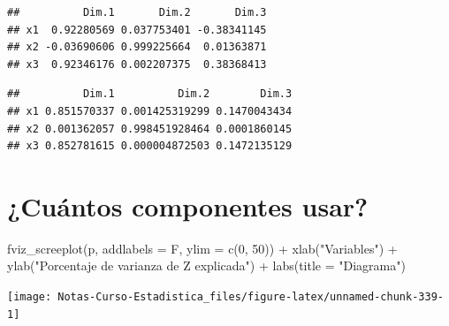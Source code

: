 \documentclass[
  12pt,
]{book}
\newenvironment{Shaded}{\begin{snugshade}}{\end{snugshade}}
\newcommand{\AttributeTok}[1]{\textcolor[rgb]{0.77,0.63,0.00}{#1}}
\newcommand{\DecValTok}[1]{\textcolor[rgb]{0.00,0.00,0.81}{#1}}
\newcommand{\FunctionTok}[1]{\textcolor[rgb]{0.00,0.00,0.00}{#1}}
\newcommand{\NormalTok}[1]{#1}
\newcommand{\SpecialCharTok}[1]{\textcolor[rgb]{0.00,0.00,0.00}{#1}}
\newcommand{\StringTok}[1]{\textcolor[rgb]{0.31,0.60,0.02}{#1}}
\begin{document}
\begin{verbatim}
##          Dim.1       Dim.2       Dim.3
## x1  0.92280569 0.037753401 -0.38341145
## x2 -0.03690606 0.999225664  0.01363871
## x3  0.92346176 0.002207375  0.38368413
\end{verbatim}

\begin{Shaded}
\end{Shaded}

\begin{verbatim}
##          Dim.1          Dim.2        Dim.3
## x1 0.851570337 0.001425319299 0.1470043434
## x2 0.001362057 0.998451928464 0.0001860145
## x3 0.852781615 0.000004872503 0.1472135129
\end{verbatim}

\hypertarget{cuuxe1ntos-componentes-usar}{%
\section{¿Cuántos componentes usar?}\label{cuuxe1ntos-componentes-usar}}

\begin{Shaded}
\begin{Highlighting}[]
\FunctionTok{fviz\_screeplot}\NormalTok{(p, }\AttributeTok{addlabels =}\NormalTok{ F, }\AttributeTok{ylim =} \FunctionTok{c}\NormalTok{(}\DecValTok{0}\NormalTok{, }\DecValTok{50}\NormalTok{)) }\SpecialCharTok{+}
    \FunctionTok{xlab}\NormalTok{(}\StringTok{"Variables"}\NormalTok{) }\SpecialCharTok{+} \FunctionTok{ylab}\NormalTok{(}\StringTok{"Porcentaje de varianza de Z explicada"}\NormalTok{) }\SpecialCharTok{+}
    \FunctionTok{labs}\NormalTok{(}\AttributeTok{title =} \StringTok{"Diagrama"}\NormalTok{)}
\end{Highlighting}
\end{Shaded}

\begin{center}\texttt{[image: Notas-Curso-Estadistica\_files/figure-latex/unnamed-chunk-339-1]} \end{center}
\end{document}
